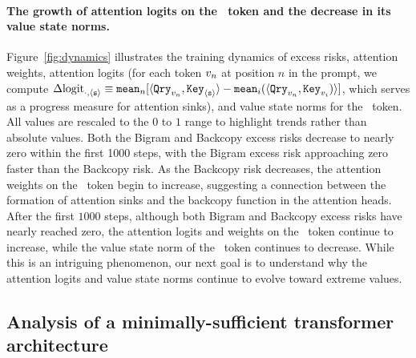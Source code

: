 \begin{figure}
{    %
    }
    \label{figure:verify-assumptions}
\end{figure}

\paragraph{The growth of attention logits on the \bos~token and the decrease in its value state norms.} Figure~\ref{fig:dynamics} illustrates the training dynamics of excess risks, attention weights, attention logits (for each token $v_n$ at position $n$ in the prompt, we compute $\Delta\text{logit}_{\cdot,\texttt{$\langle \texttt{s}\rangle$}} \equiv \mathtt{mean}_{n}[\langle {\tt Qry}_{v_n}, {\tt Key}_{\texttt{$\langle \texttt{s}\rangle$}} \rangle - \mathtt{mean}_{i}(\langle {\tt Qry}_{v_n}, {\tt Key}_{v_i}) \rangle]$, which serves as a progress measure for attention sinks), and value state norms for the \bos~token. All values are rescaled to the $0$ to $1$ range to highlight trends rather than absolute values. Both the Bigram and Backcopy excess risks decrease to nearly zero within the first 1000 steps, with the Bigram excess risk approaching zero faster than the Backcopy risk. As the Backcopy risk decreases, the attention weights on the \bos~token begin to increase, suggesting a connection between the formation of attention sinks and the backcopy function in the attention heads. After the first $1000$ steps, although both Bigram and Backcopy excess risks have nearly reached zero, the attention logits and weights on the \bos~token continue to increase, while the value state norm of the \bos~token continues to decrease. While this is an intriguing phenomenon, our next goal is to understand why the attention logits and value state norms continue to evolve toward extreme values. 



\subsection{Analysis of a minimally-sufficient transformer architecture}
\label{sec:simple-model}


